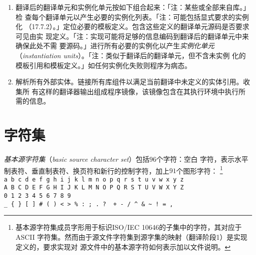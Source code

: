 \begin{enumerate}[label={\arabic*}]
{    产生的标记作为翻译单元进行语法和语义分析。「注：分析与翻译标记的过程可能偶尔
    会有一个标记被替换成其他标记序列的情况（17.2）。」「注：源文件，翻译单元和翻
    译后的翻译单元不一定存成文件，这些实体与外部表示间也不一定存在一一对应关系。
    描述只是概念上的，且不指定某一特定实现。」}
  \item{翻译后的翻译单元和实例化单元按如下组合起来：「注：某些或全部来自库。」检
    查每个翻译单元以产生必要的实例化列表。「注：可能包括显式要求的实例化
    （17.7.2）。」定位必要的模板定义。包含这些定义的翻译单元源码是否要求可见由实
    现定义。「注：实现可能将足够的信息编码到翻译后的翻译单元中来确保此处不需
    要源码。」进行所有必要的实例化以产生\textit{实例化单元}
    （\textit{instantiation units}）。「注：类似于翻译后的翻译单元，但不含未实例
    化的模板引用和模板定义。」如任何实例化失败则程序为病态。}
  \item{解析所有外部实体。链接所有库组件以满足当前翻译中未定义的实体引用。收集所
    有这样的翻译器输出组成程序镜像，该镜像包含在其执行环境中执行所需的信息。}
\end{enumerate}

\section{字符集}
\paragraph{}
\textit{基本源字符集}（\textit{basic source character set}）包括$96$个字符：空白
字符，表示水平制表符、垂直制表符、换页符和新行的控制字符，加上$91$个图形字符：
\footnote{基本源字符集成员字形用于标识ISO/IEC 10646的子集中的字符，其对应于ASCII
字符集。然而由于源文件字符集到源字集的映射（翻译阶段1）是实现定义的，要求实现对
源文件中的基本源字符如何表示加以文件说明。}                                   \\
\mbox{\qquad \texttt{a b c d e f g h i j k l m n o p q r s t u v w x y z}}    \\
\mbox{\qquad \texttt{A B C D E F G H I J K L M N O P Q R S T U V W X Y Z}}    \\
\mbox{\qquad \texttt{0 1 2 3 4 5 6 7 8 9}}                                    \\
\mbox{\qquad \texttt{\_ \{ \} [ ] \# ( ) \textless{} \textgreater{} \% :\ ; .\
?\ \textasteriskcentered{} + - / \textasciicircum{} \& \textbar{}
\textasciitilde{} !\ = , \bslh{} \qdbl{} \qsgl}}


